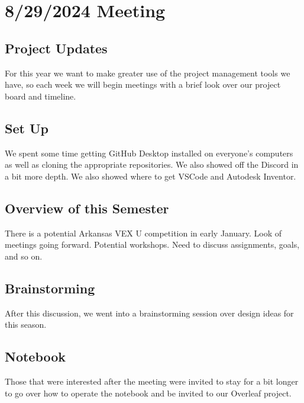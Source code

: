 
\section{8/29/2024 Meeting}
\subsection{Project Updates}
For this year we want to make greater use of the project management tools we have, so each week we will begin meetings with a brief look over our project board and timeline. 

\subsection{Set Up}
We spent some time getting GitHub Desktop installed on everyone's computers as well as cloning the appropriate repositories. We also showed off the Discord in a bit more depth. We also showed where to get VSCode and Autodesk Inventor. 

\subsection{Overview of this Semester}
There is a potential Arkansas VEX U competition in early January. 
Look of meetings going forward.
Potential workshops.
Need to discuss assignments, goals, and so on.

\subsection{Brainstorming}
After this discussion, we went into a brainstorming session over design ideas for this season. 

\subsection{Notebook}
Those that were interested after the meeting were invited to stay for a bit longer to go over how to operate the notebook and be invited to our Overleaf project. 
